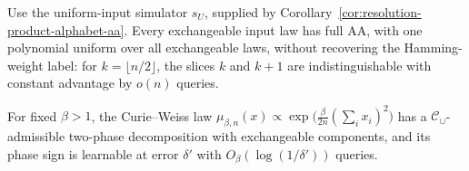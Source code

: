 \begin{proposition}
\label{ian:phase-label-positive-instances}
Use the uniform-input simulator \(s_U\), supplied by
Corollary~\ref{cor:resolution-product-alphabet-aa}. Every exchangeable
input law has full AA, with
one polynomial uniform over all exchangeable laws, without recovering
the Hamming-weight label: for \(k=\lfloor n/2\rfloor\), the slices \(k\)
and \(k+1\) are indistinguishable with constant advantage by \(o(n)\)
queries.

For fixed \(\beta>1\), the Curie--Weiss law
\(\mu_{\beta,n}(x)\propto\exp\bigl(\frac{\beta}{2n}(\sum_ix_i)^2\bigr)\)
has a \(\mathcal C_\cup\)-admissible two-phase decomposition with
exchangeable components, and its phase sign is learnable at error
\(\delta'\) with \(O_\beta(\log(1/\delta'))\) queries.
\end{proposition}


